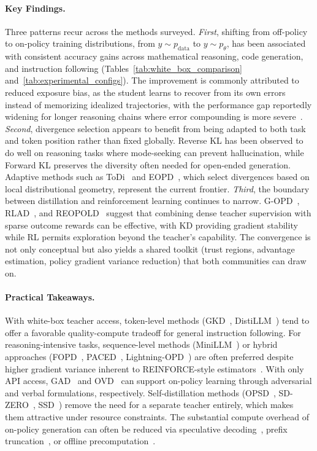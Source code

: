 \documentclass{article} %
\newcommand{\ptheta}{p_\theta}
\newcommand{\pdata}{p_{\mathrm{data}}}
\begin{document}
\paragraph{Key Findings.} Three patterns recur across the methods surveyed. \emph{First}, shifting from off-policy to on-policy training distributions, from $y \sim \pdata$ to $y \sim \ptheta$, has been associated with consistent accuracy gains across mathematical reasoning, code generation, and instruction following (Tables~\ref{tab:white_box_comparison} and~\ref{tab:experimental_configs}). The improvement is commonly attributed to reduced exposure bias, as the student learns to recover from its own errors instead of memorizing idealized trajectories, with the performance gap reportedly widening for longer reasoning chains where error compounding is more severe~\citep{2306.08543,2306.13649}. \emph{Second}, divergence selection appears to benefit from being adapted to both task and token position rather than fixed globally. Reverse KL has been observed to do well on reasoning tasks where mode-seeking can prevent hallucination, while Forward KL preserves the diversity often needed for open-ended generation. Adaptive methods such as ToDi~\citep{2505.16297} and EOPD~\citep{2603.07079}, which select divergences based on local distributional geometry, represent the current frontier. \emph{Third}, the boundary between distillation and reinforcement learning continues to narrow. G-OPD~\citep{2602.12125}, RLAD~\citep{2602.22495}, and REOPOLD~\citep{2603.11137} suggest that combining dense teacher supervision with sparse outcome rewards can be effective, with KD providing gradient stability while RL permits exploration beyond the teacher's capability. The convergence is not only conceptual but also yields a shared toolkit (trust regions, advantage estimation, policy gradient variance reduction) that both communities can draw on.

\paragraph{Practical Takeaways.} With white-box teacher access, token-level methods (GKD~\citep{2306.13649}, DistiLLM~\citep{2402.03898}) tend to offer a favorable quality-compute tradeoff for general instruction following. For reasoning-intensive tasks, sequence-level methods (MiniLLM~\citep{2306.08543}) or hybrid approaches (FOPD~\citep{2602.15260}, PACED~\citep{2603.11178}, Lightning-OPD~\citep{wu2026lightning}) are often preferred despite higher gradient variance inherent to REINFORCE-style estimators~\citep{2306.08543}. With only API access, GAD~\citep{2511.10643} and OVD~\citep{2601.21968} can support on-policy learning through adversarial and verbal formulations, respectively. Self-distillation methods (OPSD~\citep{2601.18734}, SD-ZERO~\citep{he2026selfdistillation}, SSD~\citep{zhang2026embarrassingly}) remove the need for a separate teacher entirely, which makes them attractive under resource constraints. The substantial compute overhead of on-policy generation can often be reduced via speculative decoding~\citep{2410.11325}, prefix truncation~\citep{2602.15260}, or offline precomputation~\citep{wu2026lightning}.
\end{document}
